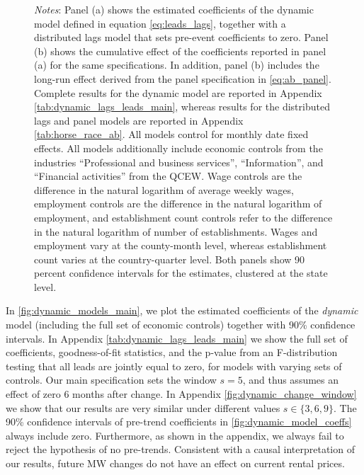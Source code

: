 \begin{figure}[htb!]
\begin{minipage}{0.95\textwidth}
		\vspace{2mm} 
		\textit{Notes}: Panel (a) shows the estimated coefficients of the dynamic model defined 
		in equation \autoref{eq:leads_lags}, together with a distributed lags model that sets 
		pre-event coefficients to zero. Panel (b) shows the cumulative effect of the coefficients 
		reported in panel (a) for the same specifications. In addition, panel (b) includes the 
		long-run effect derived from the panel specification in \autoref{eq:ab_panel}. Complete 
		results for the dynamic model are reported in Appendix 
		\autoref{tab:dynamic_lags_leads_main}, whereas results for the distributed lags and panel 
		models are reported in Appendix \autoref{tab:horse_race_ab}. All models control for 
		monthly date fixed effects. All models additionally  include economic controls from the 
		industries ``Professional and business services'', ``Information'', and ``Financial 
		activities'' from the QCEW. Wage controls are the difference in the natural logarithm of 
		average weekly wages, employment controls are the difference in the natural logarithm of 
		employment, and establishment count controls refer to the difference in the natural 
		logarithm of number of establishments. Wages and employment vary at the county-month 
		level, whereas establishment count varies at the country-quarter level. Both panels
		show 90 percent confidence intervals for the estimates, clustered at the state level. 
	\end{minipage}
\end{figure}


In \autoref{fig:dynamic_models_main}, we plot the estimated coefficients of the \textit{dynamic} 
model (including the full set of economic controls) together with 90\% confidence intervals. In
Appendix \autoref{tab:dynamic_lags_leads_main} we show the full set of coefficients, 
goodness-of-fit statistics, and the p-value from an F-distribution testing that all leads are 
jointly equal to zero, for models with varying sets of controls. Our main specification sets the 
window $s = 5$, and thus assumes an effect of zero 6 months after change. In Appendix 
\autoref{fig:dynamic_change_window} we show that our results are very similar under different 
values $s \in \{3, 6, 9\}$. The 90\% confidence intervals of pre-trend coefficients in 
\autoref{fig:dynamic_model_coeffs} always include zero. Furthermore, as shown in the appendix, 
we always fail to reject the hypothesis of no pre-trends. Consistent with a causal interpretation 
of our results, future MW changes do not have an effect on current rental prices. 

